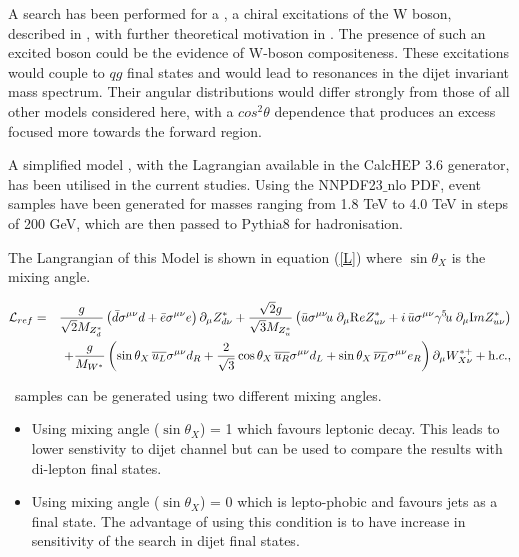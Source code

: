  A search has been performed for a \Wstar, a chiral excitations of the W boson, described in \cite{Chizhov:2010jg}, with further theoretical motivation in \cite{Chizhov:2009fc}. The presence of such an excited boson could be the evidence of W-boson compositeness. These excitations would couple to $qg$ final states and would lead to resonances in the dijet invariant mass spectrum. Their angular distributions would differ strongly from those of all other models considered here, with a $cos^{2}\theta$ dependence that produces an excess focused more towards the forward region. 

 A simplified model \cite{Chizhov:2010ry}, with the Lagrangian available in the CalcHEP 3.6 generator, has been utilised in the current studies. Using the NNPDF23$\_$nlo PDF, \Wstar event samples have been generated for masses ranging from 1.8 TeV to 4.0 TeV in steps of 200 GeV, which are then passed to Pythia8 for hadronisation. 

The Langrangian of this Model is shown in equation (\ref{L}) where $\sin \theta_{X}$ is the mixing angle.

\begin{eqnarray}\label{L}
{\cal L}_{ref}&=&\frac{g}{\sqrt{2}M_{Z^*_d}}\left(
\bar{d}\sigma^{\mu\nu}d+\bar{e}\sigma^{\mu\nu}e
\right)\partial_\mu Z^*_{d\nu}+
\frac{\sqrt{2}g}{\sqrt{3}M_{Z^*_u}}\left(\bar{u}\sigma^{\mu\nu}\!u\;
\partial_\mu {\mathrm Re}Z^*_{u\nu}+
i\,\bar{u}\sigma^{\mu\nu}\gamma^5\!u\;
\partial_\mu {\mathrm Im}Z^*_{u\nu}\right) \nonumber\\
&&\hspace{-0.8cm}+\frac{g}{M_{W^*}}\left(\sin\theta_X\,\overline{u_L}\sigma^{\mu\nu}d_R+
\frac{2}{\sqrt{3}}\cos\theta_X\,\overline{u_R}\sigma^{\mu\nu}d_L+
\sin\theta_X\,\overline{\nu_L}\sigma^{\mu\nu}e_R
\right)\partial_\mu W^{*+}_{X\nu} + {\mathrm h.c.},
\end{eqnarray}

\Wstar\ samples can be generated using two different mixing angles.
\begin{itemize}
\label{sec:WstarSamples}
\item Using mixing angle ($\sin \theta_X$) = 1 which favours leptonic decay. This leads to lower senstivity to dijet channel but can be used to compare the results with di-lepton final states.
\item Using mixing angle ($\sin \theta_X$) = 0 which is lepto-phobic and favours jets as a final state. The advantage of using this condition is to have increase in sensitivity of the search  in dijet final states. 
\end{itemize}


